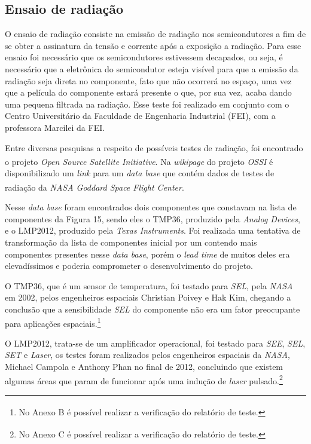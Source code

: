 \documentclass[
	12pt,				%
	openright,			%
	oneside,			%
	a4paper,			%
	english,			%
	french,				%
	spanish,			%
	brazil,				%
	oldfontcommands
	]{abntex2}
\begin{document}
\subsection[Ensaio de radiação]{Ensaio de radiação}	

	O ensaio de radiação consiste na emissão de radiação nos semicondutores a fim de se obter a assinatura da tensão e corrente após a exposição a radiação. Para esse ensaio foi necessário que os semicondutores estivessem decapados, ou seja, é necessário que a eletrônica do semicondutor esteja visível para que a emissão da radiação seja direta no componente, fato que não ocorrerá no espaço, uma vez que a película do componente estará presente o que, por sua vez, acaba dando uma pequena filtrada na radiação. Esse teste foi realizado em conjunto com o Centro Universitário da Faculdade de Engenharia Industrial (FEI), com a professora Marcilei da FEI.
	
	Entre diversas pesquisas a respeito de possíveis testes de radiação, foi encontrado o projeto \textit{Open Source Satellite Initiative}\textsuperscript{\cite{OSSI}}. Na \textit{wikipage}\textsuperscript{\cite{OSSI2}} do projeto \textit{OSSI} é disponibilizado um \textit{link} para um \textit{data base} que contém dados de testes de radiação da \textit{NASA Goddard Space Flight Center}.\textsuperscript{\cite{OSSI3}}
	
	Nesse \textit{data base} foram encontrados dois componentes que constavam na lista de componentes da Figura 15, sendo eles o TMP36, produzido pela \textit{Analog Devices}, e o LMP2012, produzido pela \textit{Texas Instruments}. Foi realizada uma tentativa de transformação da lista de componentes inicial por um contendo mais componentes presentes nesse \textit{data base}, porém o \textit{lead time} de muitos deles era elevadíssimos e poderia comprometer o desenvolvimento do projeto.
	
	O TMP36, que é um sensor de temperatura, foi testado para \textit{SEL}, pela \textit{NASA} em 2002, pelos engenheiros espaciais Christian Poivey e Hak Kim, chegando a conclusão que a sensibilidade \textit{SEL} do componente não era um fator preocupante para aplicações espaciais.\footnote{No Anexo B é possível realizar a verificação do relatório de teste.\textsuperscript{\cite{TMP36}}}
	
	O LMP2012, trata-se de um amplificador operacional, foi testado para \textit{SEE}, \textit{SEL}, \textit{SET} e \textit{Laser}, os testes foram realizados pelos engenheiros espaciais da \textit{NASA}, Michael Campola e Anthony Phan no final de 2012, concluindo que existem algumas áreas que param de funcionar após uma indução de \textit{laser} pulsado.\footnote{No Anexo C é possível realizar a verificação do relatório de teste.\textsuperscript{\cite{LMP2012}}}
	
\end{document}
